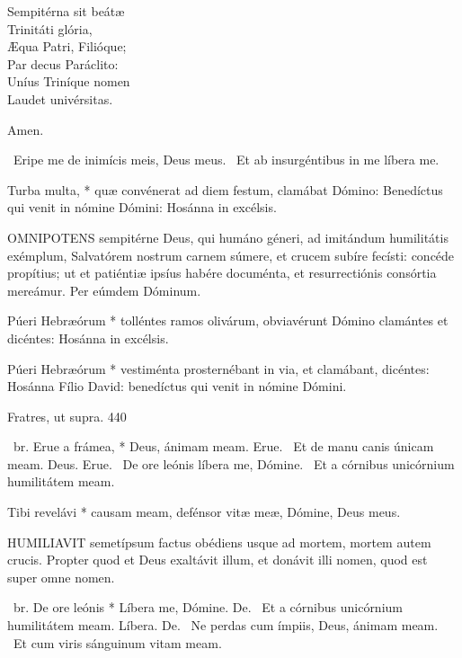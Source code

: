 Sempitérna sit beátæ\\
Trinitáti glória,\\
Æqua Patri, Filióque;\\
Par decus Paráclito:\\
Uníus Triníque nomen\\
Laudet univérsitas.

Amen.

\V\ Eripe me de inimícis meis, Deus meus. \R\ Et ab insurgéntibus in me líbera me.

 Turba multa, * quæ convénerat ad diem festum, clamábat Dómino: Benedíctus qui venit in nómine Dómini: Hosánna in excélsis.


\lettrine[lines=2]{O}{MNIPOTENS} sempitérne Deus, qui humáno géneri, ad imitándum humilitátis exémplum, Salvatórem nostrum carnem súmere, et crucem subíre fecísti: concéde propítius; ut et patiéntiæ ipsíus habére documénta, et resurrectiónis consórtia mereámur. Per eúmdem Dóminum.


 Púeri Hebræórum * tolléntes ramos olivárum, obviavérunt Dómino clamántes et dicéntes: Hosánna in excélsis.


 Púeri Hebræórum * vestiménta prosternébant in via, et clamábant, dicéntes: Hosánna Fílio David: benedíctus qui venit in nómine Dómini.

 Fratres, ut supra. 440

\R\ br. Erue a frámea, * Deus, ánimam meam. Erue. \V\ Et de manu canis únicam meam. Deus. Erue. \V\ De ore leónis líbera me, Dómine. \R\ Et a córnibus unicórnium humilitátem meam.


 Tibi revelávi * causam meam, defénsor vitæ meæ, Dómine, Deus meus.


\lettrine[lines=2]{H}{UMILIAVIT} semetípsum factus obédiens usque ad mortem, mortem autem crucis. Propter quod et Deus exaltávit illum, et donávit illi nomen, quod est super omne nomen.

\R\ br. De ore leónis * Líbera me, Dómine. De. \V\ Et a córnibus unicórnium humilitátem meam. Líbera. De. \V\ Ne perdas cum ímpiis, Deus, ánimam meam. \R\ Et cum viris sánguinum vitam meam.

